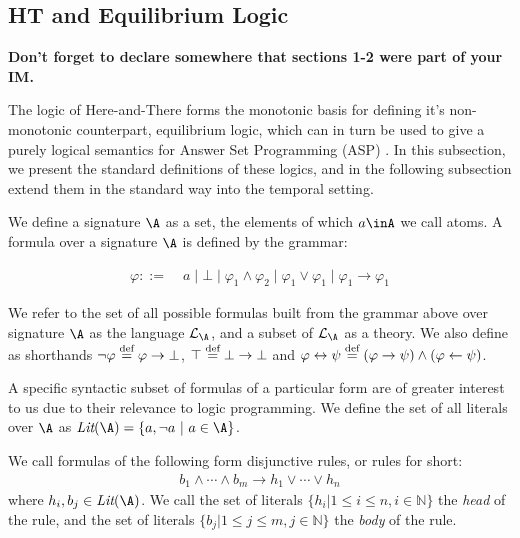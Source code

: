 \subsection{HT and Equilibrium Logic}

\textbf{Don't forget to declare somewhere that sections 1-2 were part
  of your IM.}

The logic of Here-and-There forms the monotonic basis for defining
it's non-monotonic counterpart, equilibrium logic, which can in turn
be used to give a purely logical semantics for Answer Set Programming
(ASP) \cite{pearce06a}. In this subsection, we present the standard
definitions of these logics, and in the following subsection extend
them in the standard way into the temporal setting.

We define a signature $\A$ as a set, the elements of which $a\inA$ we
call atoms. A formula over a signature $\A$ is defined by the grammar:

\begin{align*}
    \varphi ::= &\; a \mid \bot \mid
                  \varphi_1 \wedge \varphi_2 \mid
                  \varphi_1 \vee \varphi_1 \mid
                  \varphi_1 \to \varphi_1
\end{align*}

We refer to the set of all possible formulas built from the grammar
above over signature $\A$ as the language $\mathcal{L}_\A$, and a
subset of $\mathcal{L}_\A$ as a theory.  We also define as shorthands
$\neg \varphi \stackrel{\text{def}}{=} \varphi \to \bot$, $\top \stackrel{\text{def}}{=} \bot \to \bot$
and
$\varphi \leftrightarrow \psi \stackrel{\text{def}}{=} (\varphi \rightarrow \psi) \wedge
(\varphi \leftarrow \psi)$.

A specific syntactic subset of formulas of a particular form are of
greater interest to us due to their relevance to logic programming.
We define the set of all literals over $\A$ as
$\textit{Lit}(\A) = \{ a, \lnot a\ |\ a \in \A \}$.

\begin{definition}
    We call formulas of the following form disjunctive rules, or rules for short:
\begin{align*}
  b_{1} \wedge \cdots \wedge b_{m} \rightarrow h_1 \vee \cdots \vee h_{n}
\end{align*}
where $h_{i}, b_{j} \in \textit{Lit}(\A)$. We call the set of literals $\{ h_i | 1 \leq i \leq n, i\in \mathbb{N}\}$ the \emph{head} of the rule, and the set of literals $\{ b_j | 1 \leq j \leq m, j \in \mathbb{N}\}$ the \emph{body} of the rule.
\end{definition}

